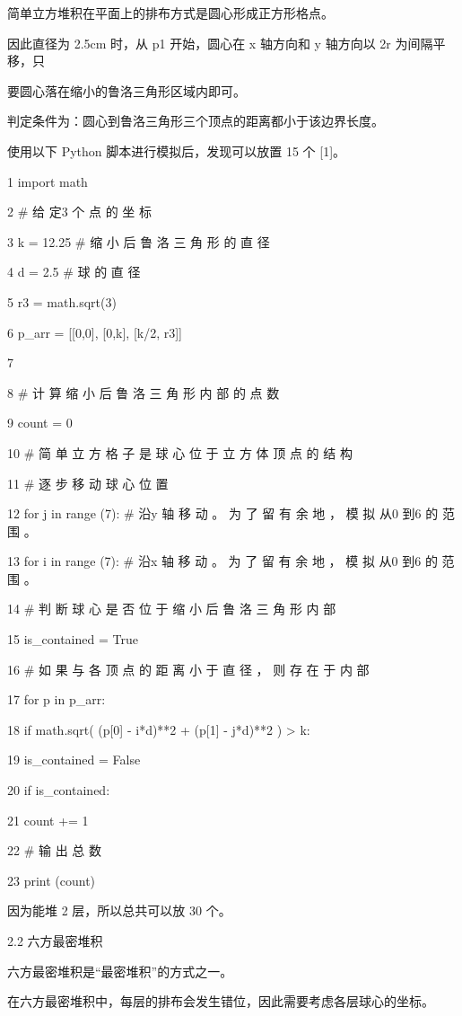 简单立方堆积在平面上的排布方式是圆心形成正方形格点。\par
因此直径为 2.5cm 时，从 p1 开始，圆心在 x 轴方向和 y 轴方向以 2r 为间隔平移，只\par
要圆心落在缩小的鲁洛三角形区域内即可。\par
判定条件为：圆心到鲁洛三角形三个顶点的距离都小于该边界长度。\par
使用以下 Python 脚本进行模拟后，发现可以放置 15 个 [1]。\par
1 import math\par
2 \# 给 定3 个 点 的 坐 标\par
3 k = 12.25 \# 缩 小 后 鲁 洛 三 角 形 的 直 径\par
4 d = 2.5 \# 球 的 直 径\par
5 r3 = math.sqrt(3)\par
6 p\_arr = [[0,0], [0,k], [k/2, r3]]\par
7\par
8 \# 计 算 缩 小 后 鲁 洛 三 角 形 内 部 的 点 数\par
9 count = 0\par
10 \# 简 单 立 方 格 子 是 球 心 位 于 立 方 体 顶 点 的 结 构\par
11 \# 逐 步 移 动 球 心 位 置\par
12 for j in range (7): \# 沿y 轴 移 动 。 为 了 留 有 余 地 ， 模 拟 从0 到6 的 范 围 。\par
13 for i in range (7): \# 沿x 轴 移 动 。 为 了 留 有 余 地 ， 模 拟 从0 到6 的 范 围 。\par
14 \# 判 断 球 心 是 否 位 于 缩 小 后 鲁 洛 三 角 形 内 部\par
15 is\_contained = True\par
16 \# 如 果 与 各 顶 点 的 距 离 小 于 直 径 ， 则 存 在 于 内 部\par
17 for p in p\_arr:\par
18 if math.sqrt( (p[0] - i*d)**2 + (p[1] - j*d)**2 ) > k:\par
19 is\_contained = False\par
20 if is\_contained:\par
21 count += 1\par
22 \# 输 出 总 数\par
23 print (count)\par
因为能堆 2 层，所以总共可以放 30 个。\par
2.2 六方最密堆积\par
六方最密堆积是“最密堆积”的方式之一。\par
在六方最密堆积中，每层的排布会发生错位，因此需要考虑各层球心的坐标。\par
